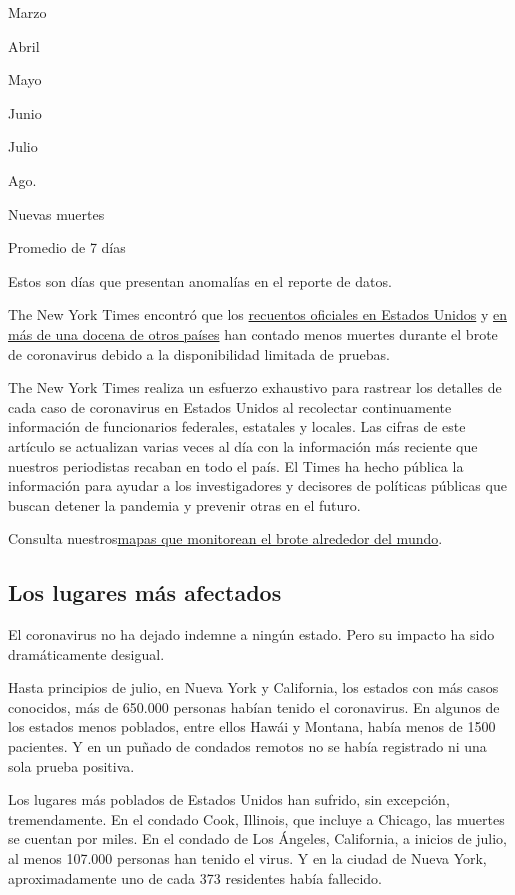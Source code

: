 Marzo

Abril

Mayo

Junio

Julio

Ago.

Nuevas muertes

Promedio de 7 días

Estos son días que presentan anomalías en el reporte de datos.

The New York Times encontró que los
\href{https://www.nytimes.com/interactive/2020/04/28/us/coronavirus-death-toll-total.html}{recuentos
oficiales en Estados Unidos} y
\href{https://www.nytimes.com/interactive/2020/04/21/world/coronavirus-missing-deaths.html}{en
más de una docena de otros países} han contado menos muertes durante el
brote de coronavirus debido a la disponibilidad limitada de pruebas.

The New York Times realiza un esfuerzo exhaustivo para rastrear los
detalles de cada caso de coronavirus en Estados Unidos al recolectar
continuamente información de funcionarios federales, estatales y
locales. Las cifras de este artículo se actualizan varias veces al día
con la información más reciente que nuestros periodistas recaban en todo
el país. El Times ha hecho pública la información para ayudar a los
investigadores y decisores de políticas públicas que buscan detener la
pandemia y prevenir otras en el futuro.

Consulta
nuestros\href{https://www.nytimes.com/interactive/2020/world/coronavirus-maps.html}{mapas
que monitorean el brote alrededor del mundo}.

\hypertarget{los-lugares-muxe1s-afectados}{%
\subsection{Los lugares más
afectados}\label{los-lugares-muxe1s-afectados}}

El coronavirus no ha dejado indemne a ningún estado. Pero su impacto ha
sido dramáticamente desigual.

Hasta principios de julio, en Nueva York y California, los estados con
más casos conocidos, más de 650.000 personas habían tenido el
coronavirus. En algunos de los estados menos poblados, entre ellos Hawái
y Montana, había menos de 1500 pacientes. Y en un puñado de condados
remotos no se había registrado ni una sola prueba positiva.

Los lugares más poblados de Estados Unidos han sufrido, sin excepción,
tremendamente. En el condado Cook, Illinois, que incluye a Chicago, las
muertes se cuentan por miles. En el condado de Los Ángeles, California,
a inicios de julio, al menos 107.000 personas han tenido el virus. Y en
la ciudad de Nueva York, aproximadamente uno de cada 373 residentes
había fallecido.

